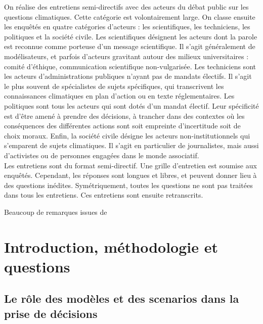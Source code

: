 \begin{methodbox}

On réalise des entretiens semi-directifs avec des acteurs du débat public sur les questions climatiques. Cette catégorie est volontairement large. On classe ensuite les enquêtés en quatre catégories d'acteurs : les scientifiques, les techniciens, les politiques et la société civile. Les scientifiques désignent les acteurs dont la parole est reconnue comme porteuse d'un message scientifique. Il s'agit généralement de modélisateurs, et parfois d'acteurs gravitant autour des milieux universitaires : comité d'éthique, communication scientifique non-vulgarisée. Les techniciens sont les acteurs d'administrations publiques n'ayant pas de mandats électifs. Il s'agit le plus souvent de spécialistes de sujets spécifiques, qui transcrivent les connaissances climatiques en plan d'action ou en texte réglementaires. Les politiques sont tous les acteurs qui sont dotés d'un mandat électif. Leur spécificité est d'être amené à prendre des décisions, à trancher dans des contextes où les conséquences des différentes actions sont soit empreinte d'incertitude soit de choix moraux. Enfin, la société civile désigne les acteurs non-institutionnels qui s'emparent de sujets climatiques. Il s'agit en particulier de journalistes, mais aussi d'activistes ou de personnes engagées dans le monde associatif. \\

Les entretiens sont du format semi-directif. Une grille d'entretien est soumise aux enquêtés. Cependant, les réponses sont longues et libres, et peuvent donner lieu à des questions inédites. Symétriquement, toutes les questions ne sont pas traitées dans tous les entretiens. Ces entretiens sont ensuite retranscrits. 
\end{methodbox}


Beaucoup de remarques issues de \cite{intergovernmental_panel_on_climate_change_ipcc_mitigation_2023}



\section{Introduction, méthodologie et questions}

\subsection{Le rôle des modèles et des scenarios dans la prise de décisions}


